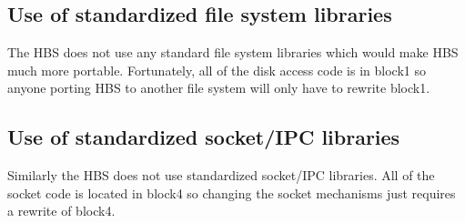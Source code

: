\subsection{Use of standardized file system libraries}

The HBS does not use any standard file system libraries which would make
HBS much more portable.  Fortunately, all of the disk access code is in
block1 so anyone porting HBS to another file system will only have to
rewrite block1.

\subsection{Use of standardized socket/IPC libraries}

Similarly the HBS does not use standardized socket/IPC libraries.  All of
the socket code is located in block4 so changing the socket mechanisms just
requires a rewrite of block4.
